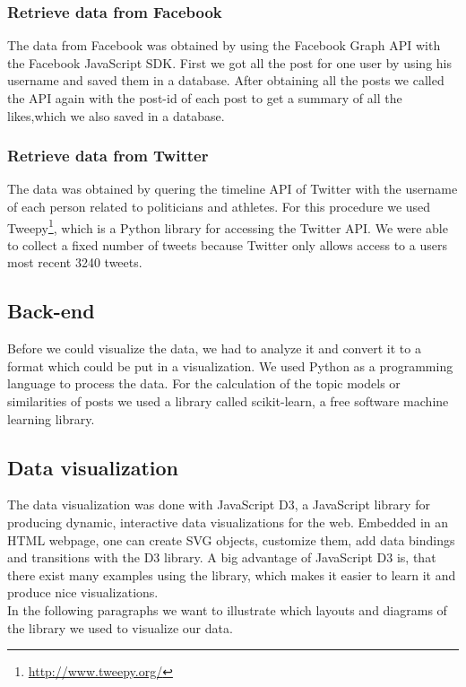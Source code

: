 \subsubsection{Retrieve data from Facebook}
The data from Facebook was obtained by using the Facebook Graph API with the Facebook JavaScript SDK. First we got all the post for one user by using his username and saved them in a database. After obtaining all the posts we called the API again with the post-id of each post to get a summary of all the likes,which we also saved in a database.

\subsubsection{Retrieve data from Twitter}

The data was obtained by quering the timeline API of Twitter with the username of each person related to politicians and athletes. For this procedure we used  Tweepy\footnote{\url{http://www.tweepy.org/}}, which is a Python library for accessing the Twitter API. We were able to collect a fixed number of tweets because Twitter only allows access to a users most recent 3240 tweets.  

\subsection{Back-end}
Before we could visualize the data, we had to analyze it and convert it to a format which could be put in a visualization. We used Python as a programming language to process the data. For the calculation of the topic models or similarities of posts we used a library called scikit-learn, a free software machine learning library.   

\subsection{Data visualization}
The data visualization was done  with JavaScript D3, a JavaScript library for producing dynamic, interactive data visualizations for the web. Embedded in an HTML webpage, one can create SVG objects, customize them, add data bindings and transitions  with the D3 library. A big advantage of JavaScript D3 is, that there exist many examples using the library, which makes it easier to learn it and produce nice visualizations. \\
In the following paragraphs we want to illustrate which layouts and diagrams of the library we used to visualize our data. 


